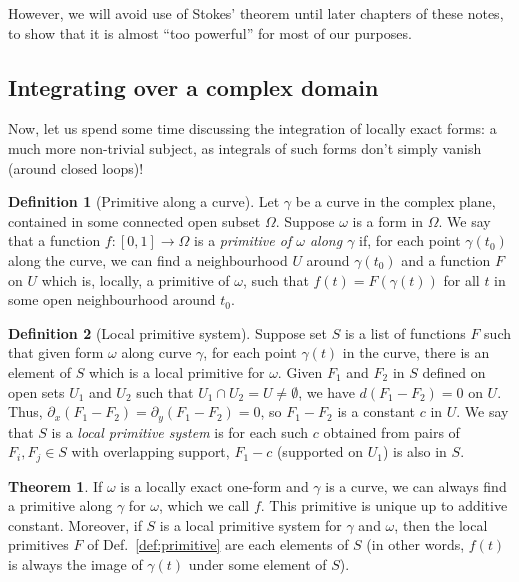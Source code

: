 \documentclass[aps,pra,showpacs,notitlepage,onecolumn,superscriptaddress,nofootinbib]{revtex4-1}
\theoremstyle{definition}
\newtheorem{definition}{Definition}[section]
\newtheorem{theorem}{Theorem}[section]
\begin{document}
However, we will avoid use of Stokes' theorem until later chapters of these notes, to show that it is almost ``too powerful'' for most of our purposes.

\subsection{Integrating over a complex domain}

\noindent Now, let us spend some time discussing the integration of locally exact forms: a much more non-trivial subject, as integrals of such forms don't simply vanish (around closed loops)!
\newline

\begin{definition}[Primitive along a curve]
  Let $\gamma$ be a curve in the complex plane, contained in some connected open subset $\Omega$. Suppose $\omega$ is a form in $\Omega$. We say that a function $f : [0, 1] \rightarrow \Omega$
  is a \emph{primitive of $\omega$ along $\gamma$} if, for each point $\gamma(t_0)$ along the curve, we can find a neighbourhood $U$ around $\gamma(t_0)$ and a function $F$ on $U$ which is, locally,
  a primitive of $\omega$, such that $f(t) = F(\gamma(t))$ for all $t$ in some open neighbourhood around $t_0$.
\end{definition}

\begin{definition}[Local primitive system]
  Suppose set $S$ is a list of functions $F$ such that given form $\omega$ along curve $\gamma$, for each point $\gamma(t)$ in the curve, there is an element of $S$
  which is a local primitive for $\omega$. Given $F_1$ and $F_2$ in $S$ defined on open sets $U_1$ and $U_2$ such that $U_1 \cap U_2 = U \neq \emptyset$, we have
  $d(F_1 - F_2) = 0$ on $U$. Thus, $\partial_x(F_1 - F_2) = \partial_y(F_1 - F_2) = 0$, so $F_1 - F_2$ is a constant $c$ in $U$. We say that $S$ is a \emph{local primitive system}
  is for each such $c$ obtained from pairs of $F_i, F_j \in S$ with overlapping support, $F_1 - c$ (supported on $U_1$) is also in $S$.
\end{definition}

\begin{theorem}
  If $\omega$ is a locally exact one-form and $\gamma$ is a curve, we can always find a primitive along $\gamma$ for $\omega$, which we call $f$. This primitive
  is unique up to additive constant. Moreover, if $S$ is a local primitive system for $\gamma$ and $\omega$, then the local primitives $F$ of Def.~\ref{def:primitive}
  are each elements of $S$ (in other words, $f(t)$ is always the image of $\gamma(t)$ under some element of $S$).
\end{theorem}
\end{document}
